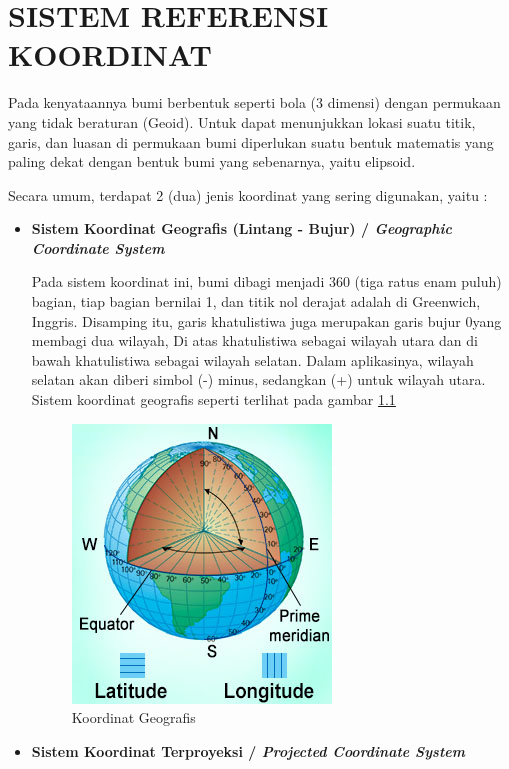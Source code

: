 \chapter{SISTEM REFERENSI KOORDINAT}

Pada kenyataannya bumi berbentuk seperti bola (3 dimensi) dengan permukaan yang tidak beraturan (Geoid). Untuk dapat menunjukkan lokasi suatu titik, garis, dan luasan di permukaan bumi diperlukan suatu bentuk matematis yang paling dekat dengan bentuk bumi yang sebenarnya, yaitu elipsoid.

Secara umum, terdapat 2 (dua) jenis koordinat yang sering digunakan, yaitu :

\begin{itemize}
  \item \textbf{Sistem Koordinat Geografis (Lintang - Bujur) / \textit{Geographic Coordinate System}}
  
    Pada sistem koordinat ini, bumi dibagi menjadi 360 (tiga ratus enam puluh) bagian, tiap bagian bernilai 1\degree, dan titik nol derajat adalah di Greenwich, Inggris. Disamping itu, garis khatulistiwa juga merupakan garis bujur 0\degree yang membagi dua wilayah, Di atas khatulistiwa sebagai wilayah utara dan di bawah khatulistiwa sebagai wilayah selatan. Dalam aplikasinya, wilayah selatan akan diberi simbol (-) minus, sedangkan (+) untuk wilayah utara. Sistem koordinat geografis seperti terlihat pada gambar \ref{fig:koordinatgeografis}
    
    \begin{figure}[H]
      \centering
      \includegraphics[scale=1]{./resources/015-koordinat-geografis}
      \caption{Koordinat Geografis}
      \label{fig:koordinatgeografis}
    \end{figure}
  
  \item \textbf{Sistem Koordinat Terproyeksi / \textit{Projected Coordinate System}}
  

\end{itemize}
